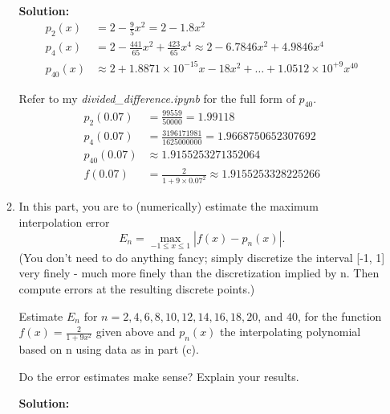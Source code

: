 \documentclass[conference,onecolumn]{IEEEtran}
\begin{document}
\begin{enumerate}[label=\arabic{enumi}.]
\begin{enumerate}
                    \textbf{Solution:}
                    \begin{align*}
                        p_2(x)    & = 2 - \frac{9}{5}x^2 = 2 - 1.8x^2                                                   \\
                        p_4(x)    & = 2 - \frac{441}{65}x^2 + \frac{423}{65}x^4 \approx 2 - 6.7846x^2 + 4.9846x^4       \\
                        p_{40}(x) & \approx 2 + 1.8871 \times 10^{-15}x - 18 x^2 + \ldots + 1.0512 \times 10^{+9}x^{40}
                    \end{align*}

                    Refer to my \textit{divided\_difference.ipynb} for the full form of $p_{40}$.
                    \begin{align*}
                        p_2(0.07)    & = \frac{99559}{50000} = 1.99118                            \\
                        p_4(0.07)    & = \frac{3196171981}{1625000000} = 1.9668750652307692       \\
                        p_{40}(0.07) & \approx  1.9155253271352064                                \\
                        f(0.07)      & = \frac{2}{1 + 9 \times 0.07^2} \approx 1.9155253328225266
                    \end{align*}
              \item In this part, you are to (numerically) estimate the maximum interpolation error
                    $$
                        E_n = \max_{-1 \leq x \leq 1} |f(x) - p_n(x)|.
                    $$
                    (You don't need to do anything fancy; simply discretize the interval [-1, 1] very finely - much more finely than the discretization implied by n.
                    Then compute errors at the resulting discrete points.)

                    Estimate $E_n$ for $n = 2, 4, 6, 8, 10, 12, 14, 16, 18, 20$, and $40$, for the function $f(x) = \frac{2}{1 + 9 x^2}$ given above and $p_n(x)$ the interpolating polynomial based on n using data as in part (c).

                    Do the error estimates make sense? Explain your results.

                    \textbf{Solution:}


\end{enumerate}
\end{enumerate}
\end{document}

